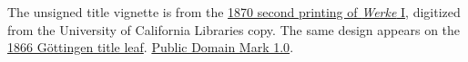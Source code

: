 \par\medskip\noindent The unsigned title vignette is from the \href{https://commons.wikimedia.org/w/index.php?oldid=1179960952}{1870 second printing of \textit{Werke} I}, digitized from the University of California Libraries copy. The same design appears on the \href{https://gdz.sub.uni-goettingen.de/id/PPN235999628}{1866 Göttingen title leaf}. \href{https://creativecommons.org/publicdomain/mark/1.0/}{Public Domain Mark 1.0}.
\par\endgroup\clearpage
